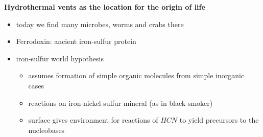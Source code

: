 \documentclass{article}
\theoremstyle{sltheorem}
\begin{document}
\textbf{Hydrothermal vents as the location for the origin of life}
\begin{itemize}
    \item today we find many microbes, worms and crabs there
    \item Ferrodoxin: ancient iron-sulfur protein
    \item iron-sulfur world hypothesis
    \begin{itemize}
        \item assumes formation of simple organic molecules from simple inorganic cases
        \item reactions on iron-nickel-sulfur mineral (as in black smoker)
        \item surface gives environment for reactions of $HCN$ to yield precursors to the nucleobases
    \end{itemize}
\end{itemize}
\end{document}
